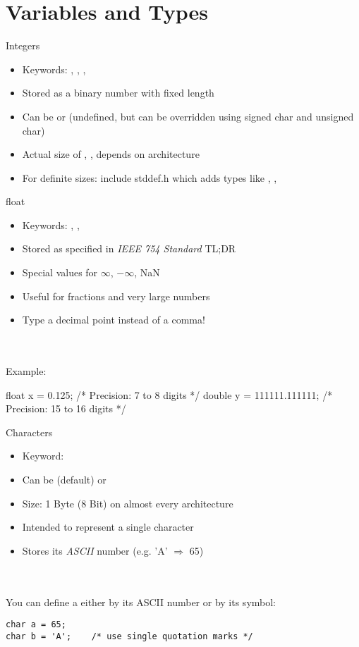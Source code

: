\documentclass[10pt,graphics,aspectratio=169,table]{beamer}
\begin{document}
\section{Variables and Types}
\begin{frame}{Integers}
    \begin{itemize}
        \item Keywords: , , , 
        \item Stored as a binary number with fixed length
        \item Can be  or  (undefined, but can be overridden using signed char and unsigned char)
        \item Actual size of , ,  depends on architecture
        \item For definite sizes: include stddef.h which adds types like , , 
    \end{itemize}
\end{frame}
\begin{frame}[fragile]{float}
    \begin{itemize}
        \item Keywords: , , 
        \item Stored as specified in \textit{IEEE 754 Standard} TL;DR
        \item Special values for $\infty$, $-\infty$, NaN
        \item Useful for fractions and very large numbers
        \item Type a decimal point instead of a comma!
    \end{itemize}\ \\
    \ \\
    Example:
    \begin{codeblock}
float x = 0.125;             /* Precision: 7 to 8 digits */
double y = 111111.111111;    /* Precision: 15 to 16 digits */
    \end{codeblock}

\end{frame}
\begin{frame}[fragile]{Characters}
    \begin{itemize}
        \item Keyword: 
        \item Can be (default) or     
        \item Size: 1 Byte (8 Bit) on almost every architecture
        \item Intended to represent a single character
        \item Stores its \textit{ASCII} number (e.g. 'A' $\Rightarrow$ 65)
    \end{itemize}\ \\
    \ \\
    You can define a  either by its ASCII number or by its symbol:
    \begin{lstlisting}[numbers=none]
char a = 65;
char b = 'A';    /* use single quotation marks */
\end{lstlisting}
\end{frame}
\end{document}
